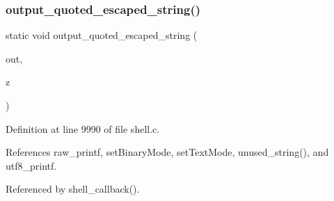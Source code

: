 \subsubsection{output\+\_\+quoted\+\_\+escaped\+\_\+string()}
{\footnotesize\ttfamily static void output\+\_\+quoted\+\_\+escaped\+\_\+string (\begin{DoxyParamCaption}\item[{F\+I\+LE $\ast$}]{out,  }\item[{const char $\ast$}]{z }\end{DoxyParamCaption})\hspace{0.3cm}{\ttfamily [static]}}



Definition at line 9990 of file shell.\+c.



References raw\+\_\+printf, set\+Binary\+Mode, set\+Text\+Mode, unused\+\_\+string(), and utf8\+\_\+printf.



Referenced by shell\+\_\+callback().


